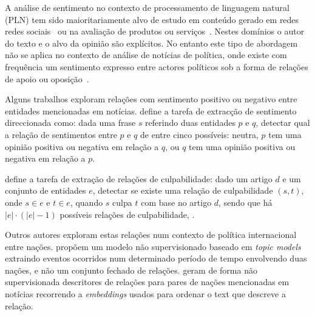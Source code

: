 \documentclass[a4paper, twocolumn, 11pt, twoside]{article}
\begin{document}
A análise de sentimento no contexto de processamento de linguagem natural (PLN) tem sido maioritariamente alvo de estudo em conteúdo gerado em redes redes sociais~\citep{10.1145/3185045} ou na avaliação de produtos ou serviços~\citep{pontiki-etal-2016-semeval}. Nestes domínios o autor do texto e o alvo da opinião são explícitos. No entanto este tipo de abordagem não se aplica no contexto de análise de notícias de política, onde existe com frequência um sentimento expresso entre actores políticos sob a forma de relações de apoio ou oposição~\citep{balahur2009opinion, balahur-etal-2010-sentiment}.

Alguns trabalhos exploram relações com sentimento positivo ou negativo entre entidades mencionadas em notícias. \cite{park-etal-2021-blames} define a tarefa de extracção de sentimento direccionada como: dada uma frase $s$ referindo duas entidades $p$ e $q$, detectar qual a relação de sentimentos entre $p$ e $q$ de entre cinco possíveis: neutra, $p$ tem uma opinião positiva ou negativa em relação a $q$, ou $q$ tem uma opinião positiva ou negativa em relação a $p$.


\cite{liang2019blames} define a tarefa de extração de relações de culpabilidade: dado um artigo $d$ e um conjunto de entidades $e$, detectar se existe uma relação de culpabilidade $(s,t)$, onde $s \in e$ e $t \in e$, quando $s$ culpa $t$ com base no artigo $d$, sendo que há $|e| \cdot (|e| - 1)$ possíveis relações de culpabilidade, .


Outros autores exploram estas relações num contexto de política internacional entre nações. \cite{oconnor-etal-2013-learning} propõem um modelo não supervisionado baseado em \textit{topic models}~\cite{} extraindo eventos ocorridos num determinado período de tempo envolvendo duas nações, e não um conjunto fechado de relações. \cite{han-etal-2019-permanent} geram de forma não supervisionada descritores de relações para pares de nações mencionadas em notícias recorrendo a \textit{embeddings} usados para ordenar o text que descreve a relação.
\end{document}
